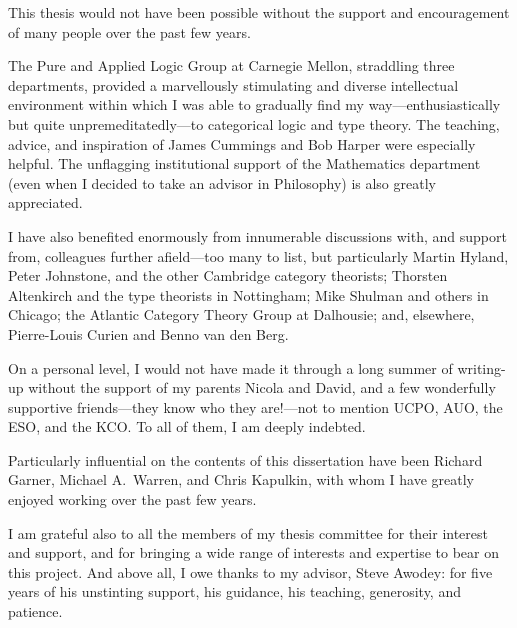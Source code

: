 This thesis would not have been possible without the support and encouragement of many people over the past few years.

The Pure and Applied Logic Group at Carnegie Mellon, straddling three departments, provided a marvellously stimulating and diverse intellectual environment within which I was able to gradually find my way---enthusiastically but quite unpremeditatedly---to categorical logic and type theory.  The teaching, advice, and inspiration of James Cummings and Bob Harper were especially helpful.  The unflagging institutional support of the Mathematics department (even when I decided to take an advisor in Philosophy) is also greatly appreciated.

I have also benefited enormously from innumerable discussions with, and support from, colleagues further afield---too many to list, but particularly Martin Hyland, Peter Johnstone, and the other Cambridge category theorists; Thorsten Altenkirch and the type theorists in Nottingham; Mike Shulman and others in Chicago; the Atlantic Category Theory Group at Dalhousie; and, elsewhere, Pierre-Louis Curien and Benno van den Berg.

On a personal level, I would not have made it through a long summer of writing-up without the support of my parents Nicola and David, and a few wonderfully supportive friends---they know who they are!---not to mention UCPO, AUO, the ESO, and the KCO.  To all of them, I am deeply indebted.

Particularly influential on the contents of this dissertation have been Richard Garner, Michael A.~Warren, and Chris Kapulkin, with whom I have greatly enjoyed working over the past few years.

I am grateful also to all the members of my thesis committee for their interest and support, and for bringing a wide range of interests and expertise to bear on this project.  And above all, I owe thanks to my advisor, Steve Awodey: for five years of his unstinting support, his guidance, his teaching, generosity, and patience. %